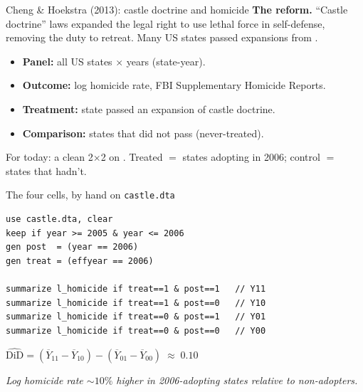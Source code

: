 \documentclass[aspectratio=169,11pt]{beamer}
\begin{document}
\begin{frame}{Cheng \& Hoekstra (2013): castle doctrine and homicide}
\vspace{0.3em}
\footnotesize
\textbf{The reform.} ``Castle doctrine'' laws expanded the legal right to use lethal force in self-defense, removing the duty to retreat. Many US states passed expansions from .
\vspace{0.4em}
\begin{itemize}
  \item \textbf{Panel:} all US states $\times$ years (state-year).
  \item \textbf{Outcome:} log homicide rate, FBI Supplementary Homicide Reports.
  \item \textbf{Treatment:} state passed an expansion of castle doctrine.
  \item \textbf{Comparison:} states that did not pass (never-treated).
\end{itemize}
\vspace{0.4em}
For today: a clean 2$\times$2 on . Treated $=$ states adopting in 2006; control $=$ states that hadn't.
\vspace{0.4em}
\end{frame}

\begin{frame}[fragile]{The four cells, by hand on \texttt{castle.dta}}
\vspace{0.2em}
\begin{lstlisting}[language={[ANSI]C}]
use castle.dta, clear
keep if year >= 2005 & year <= 2006
gen post  = (year == 2006)
gen treat = (effyear == 2006)

summarize l_homicide if treat==1 & post==1   // Y11
summarize l_homicide if treat==1 & post==0   // Y10
summarize l_homicide if treat==0 & post==1   // Y01
summarize l_homicide if treat==0 & post==0   // Y00
\end{lstlisting}
\vspace{0.4em}
\begin{center}
\small
$\widehat{\text{DiD}} = (\overline{Y}_{11} - \overline{Y}_{10}) - (\overline{Y}_{01} - \overline{Y}_{00}) \;\approx\; \mathbf{0.10}$
\end{center}
\vspace{0.2em}
\begin{center}
\small\color{warmgray}\itshape Log homicide rate $\sim 10\%$ higher in 2006-adopting states relative to non-adopters.
\end{center}
\end{frame}
\end{document}
